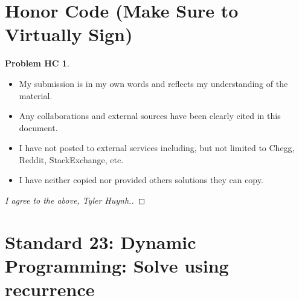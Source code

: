 \documentclass[11pt]{article}
\theoremstyle{definition}
\theoremstyle{definition}
\newtheorem*{requiredHC}{Problem HC}
\theoremstyle{definition}
\begin{document}
\newpage
\section*{Honor Code (Make Sure to Virtually Sign)} \label{HonorCode}
\hypertarget{HonorCode}{}

\begin{requiredHC}
\begin{itemize}
\item My submission is in my own words and reflects my understanding of the material.
\item Any collaborations and external sources have been clearly cited in this document.
\item I have not posted to external services including, but not limited to Chegg, Reddit, StackExchange, etc.
\item I have neither copied nor provided others solutions they can copy.
\end{itemize}

\end{requiredHC}

\begin{proof}[I agree to the above, Tyler Huynh.]
\end{proof}


\newpage
\setcounter{section}{22}
\section{Standard 23: Dynamic Programming: Solve using recurrence}
\end{document}
